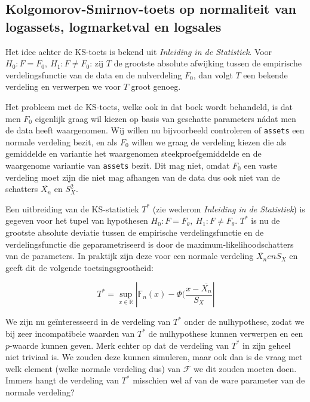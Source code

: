 \documentclass[a4paper, notitlepage]{report}
\begin{document}
\subsection{Kolgomorov-Smirnov-toets op normaliteit van logassets, logmarketval en logsales}  
  
  Het idee achter de KS-toets is bekend uit \emph{Inleiding in de Statistiek}. Voor $H_0: F = F_0, \ H_1: F \neq F_0$: zij $T$ de grootste absolute afwijking tussen de empirische verdelingsfunctie van de data en de nulverdeling $F_0$, dan volgt $T$ een bekende verdeling en verwerpen we voor $T$ groot genoeg.
  
  Het probleem met de KS-toets, welke ook in dat boek wordt behandeld, is dat men $F_0$ eigenlijk graag wil kiezen op basis van geschatte parameters n\' adat men de data heeft waargenomen. Wij willen nu bijvoorbeeld controleren of \verb!assets! een normale verdeling bezit, en als $F_0$ willen we graag de verdeling kiezen die als gemiddelde en variantie het waargenomen steekproefgemiddelde en de waargenome variantie van \verb!assets! bezit. Dit mag niet, omdat $F_0$ een vaste verdeling moet zijn die niet mag afhangen van de data dus ook niet van de schatters $\bar{X_n}$ en $S^2_X$.
  
  Een uitbreiding van de KS-statistiek $T^*$ (zie wederom \emph{Inleiding in de Statistiek}) is gegeven voor het tupel van hypothesen $H_0: F = F_{\theta}, \ H_1: F \neq F_{\theta}$. $T^*$ is nu de grootste absolute deviatie tussen de empirische verdelingsfunctie en de verdelingsfunctie die geparametriseerd is door de maximum-likelihoodschatters van de parameters. In praktijk zijn deze voor een normale verdeling $\overline{X_n} en S_X$ en geeft dit de volgende toetsingsgrootheid:

  \begin{equation}
    T^* = \sup_{x\in \mathbb{R}} | \mathbb{F}_n(x) - \Phi(\frac{x-\overline{X_n}}{S_X}|
  \end{equation}  	
	
   We zijn nu ge\"interesseerd in de verdeling van $T^*$ onder de nulhypothese, zodat we bij zeer incompatibele waarden van $T^*$ de nulhypothese kunnen verwerpen en een $p$-waarde kunnen geven. Merk echter op dat de verdeling van $T^*$ in zijn geheel niet triviaal is. We zouden deze kunnen simuleren, maar ook dan is de vraag met welk element (welke normale verdeling dus) van $\mathcal{F}$ we dit zouden moeten doen. Immers hangt de verdeling van $T^*$ misschien wel af van de ware parameter van de normale verdeling? 
   
\end{document}
